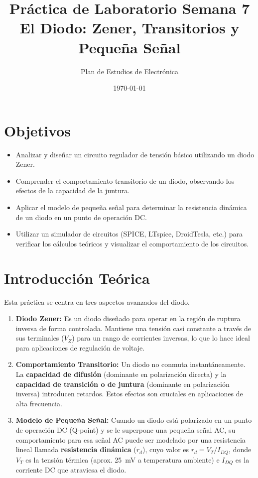 \documentclass[12pt, a4paper]{article}
\begin{document}
\title{Práctica de Laboratorio Semana 7 \\ \large El Diodo: Zener, Transitorios y Pequeña Señal}
\author{Plan de Estudios de Electrónica}
\date{\today}
\maketitle

\section*{Objetivos}

\begin{itemize}[noitemsep]
    \item Analizar y diseñar un circuito regulador de tensión básico utilizando un diodo Zener.
    \item Comprender el comportamiento transitorio de un diodo, observando los efectos de la capacidad de la juntura.
    \item Aplicar el modelo de pequeña señal para determinar la resistencia dinámica de un diodo en un punto de operación DC.
    \item Utilizar un simulador de circuitos (SPICE, LTspice, DroidTesla, etc.) para verificar los cálculos teóricos y visualizar el comportamiento de los circuitos.
\end{itemize}

\section*{Introducción Teórica}

Esta práctica se centra en tres aspectos avanzados del diodo.
\begin{enumerate}
    \item \textbf{Diodo Zener:} Es un diodo diseñado para operar en la región de ruptura inversa de forma controlada. Mantiene una tensión casi constante a través de sus terminales ($V_Z$) para un rango de corrientes inversas, lo que lo hace ideal para aplicaciones de regulación de voltaje.
    \item \textbf{Comportamiento Transitorio:} Un diodo no conmuta instantáneamente. La \textbf{capacidad de difusión} (dominante en polarización directa) y la \textbf{capacidad de transición o de juntura} (dominante en polarización inversa) introducen retardos. Estos efectos son cruciales en aplicaciones de alta frecuencia.
    \item \textbf{Modelo de Pequeña Señal:} Cuando un diodo está polarizado en un punto de operación DC (Q-point) y se le superpone una pequeña señal AC, su comportamiento para esa señal AC puede ser modelado por una resistencia lineal llamada \textbf{resistencia dinámica} ($r_d$), cuyo valor es $r_d = V_T / I_{DQ}$, donde $V_T$ es la tensión térmica (aprox. \SI{25}{\milli\volt} a temperatura ambiente) e $I_{DQ}$ es la corriente DC que atraviesa el diodo.
\end{enumerate}
\end{document}
